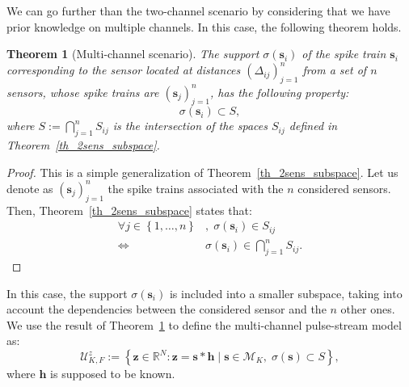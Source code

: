 \documentclass{article}
\newtheorem{theorem}{Theorem}
\newcommand{\vect}[1]{\bm{#1}}
\theoremstyle{definition}
\begin{document}
We can go further than the two-channel scenario by considering that we have prior knowledge on multiple channels. In this case, the following theorem holds.
\begin{theorem}[Multi-channel scenario]
	\label{th_multisens_subspace}
	 The support $\sigma \left(\vect{s}_i\right)$ of the spike train $\vect{s}_i$ corresponding to the sensor located at distances $\left(\Delta_{ij}\right)_{j=1}^n$ from a set of $n$ sensors, whose spike trains are $\left(\vect{s}_j\right)_{j=1}^n$, has the following property:
	\begin{equation*}
	\sigma \left(\vect{s}_i\right) \subset S,
	\end{equation*}
	where $S := \bigcap \limits_{j=1}^{n} S_{ij} $ is the intersection of the spaces $S_{ij}$ defined in Theorem~\ref{th_2sens_subspace}.
\end{theorem}
\begin{proof}
	This is a simple generalization of Theorem~\ref{th_2sens_subspace}. Let us denote as $\left(\vect{s}_j\right)_{j=1}^n$ the spike trains associated with the $n$ considered sensors.
	Then, Theorem~\ref{th_2sens_subspace} states that:
	\begin{align*}
	 \forall j \in \left\lbrace 1,\dots,n \right \rbrace &, \; \sigma \left(\vect{s}_i\right) \in S_{ij} \\
	 \Leftrightarrow & \sigma \left(\vect{s}_i\right) \in \bigcap \limits_{j=1}^{n} S_{ij}. 
	\end{align*} 
\end{proof}
In this case, the support $\sigma\left(\vect{s}_i\right)$ is included into a smaller subspace, taking into account the dependencies between the considered sensor and the $n$ other ones. 
We use the result of Theorem~\ref{th_multisens_subspace} to define the multi-channel pulse-stream model as:
\begin{equation}
\label{eq_pulse_USstream_model}
\mathcal{U}^z_{K,F}:=\left\lbrace \vect{z} \in \mathbb{R}^N: \vect{z} = \vect{s} \ast \vect{h} \; | \;\vect{s} \in \mathcal{M}_K, \; \sigma\left(\vect{s}\right) \subset S \right\rbrace,
\end{equation} 
where $\vect{h}$ is supposed to be known. 
\end{document}
